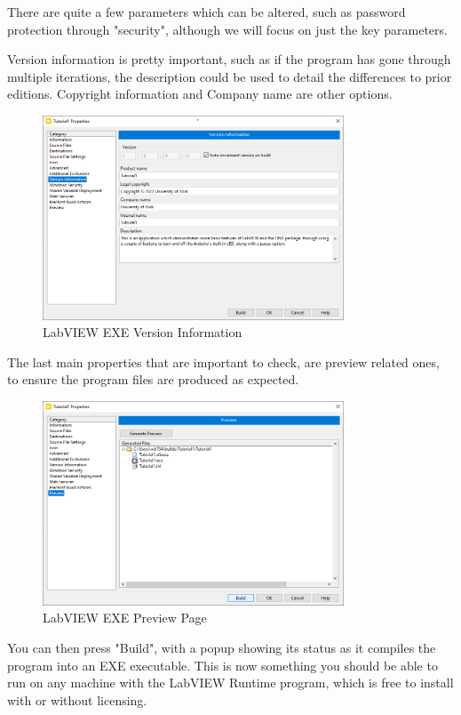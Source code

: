 \documentclass[a4paper,11pt]{report}
\begin{document}
There are quite a few parameters which can be altered, such as password protection through "security", although we will focus on just the key parameters.

Version information is pretty important, such as if the program has gone through multiple iterations, the description could be used to detail the differences to prior editions. Copyright information and Company name are other options.

\begin{figure}[H]
\centering
\includegraphics[width=0.8\textwidth]{screenshots/labview42}
\caption{LabVIEW EXE Version Information}
\end{figure}

The last main properties that are important to check, are preview related ones, to ensure the program files are produced as expected.

\begin{figure}[H]
\centering
\includegraphics[width=0.8\textwidth]{screenshots/labview43}
\caption{LabVIEW EXE Preview Page}
\end{figure}

You can then press "Build", with a popup showing its status as it compiles the program into an EXE executable. This is now something you should be able to run on any machine with the LabVIEW Runtime program, which is free to install with or without licensing.
\end{document}

